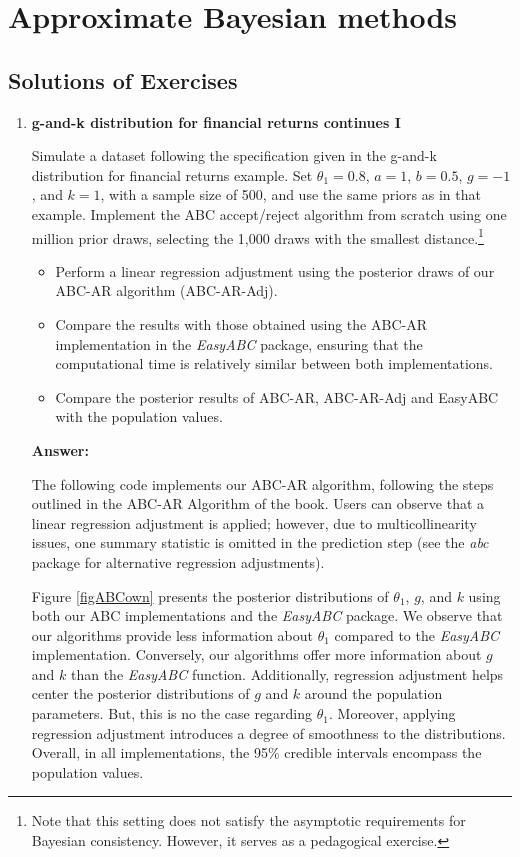 \chapter{Approximate Bayesian methods}\label{chap15}

\section*{Solutions of Exercises}\label{sec11_1}
\begin{enumerate}[leftmargin=*]

\item \textbf{g-and-k distribution for financial returns continues I}

Simulate a dataset following the specification given in the g-and-k distribution for financial returns example. Set $\theta_1 = 0.8$, $a = 1$, $b = 0.5$, $g = -1$, and $k = 1$, with a sample size of 500, and use the same priors as in that example. Implement the ABC accept/reject algorithm from scratch using one million prior draws, selecting the 1,000 draws with the smallest distance.\footnote{Note that this setting does not satisfy the asymptotic requirements for Bayesian consistency. However, it serves as a pedagogical exercise.}

\begin{itemize}
	\item Perform a linear regression adjustment using the posterior draws of our ABC-AR algorithm (ABC-AR-Adj).
	\item Compare the results with those obtained using the ABC-AR implementation in the \textit{EasyABC} package, ensuring that the computational time is relatively similar between both implementations.
	\item Compare the posterior results of ABC-AR, ABC-AR-Adj and EasyABC with the population values.
\end{itemize}

\textbf{Answer:}

The following code implements our ABC-AR algorithm, following the steps outlined in the ABC-AR Algorithm of the book. Users can observe that a linear regression adjustment is applied; however, due to multicollinearity issues, one summary statistic is omitted in the prediction step (see the \textit{abc} package for alternative regression adjustments).  

Figure \ref{figABCown} presents the posterior distributions of $\theta_1$, $g$, and $k$ using both our ABC implementations and the \textit{EasyABC} package. We observe that our algorithms provide less information about $\theta_1$ compared to the \textit{EasyABC} implementation. Conversely, our algorithms offer more information about $g$ and $k$ than the \textit{EasyABC} function. Additionally, regression adjustment helps center the posterior distributions of $g$ and $k$ around the population parameters. But, this is no the case regarding $\theta_1$. Moreover, applying regression adjustment introduces a degree of smoothness to the distributions. Overall, in all implementations, the 95\% credible intervals encompass the population values.


\end{enumerate}
